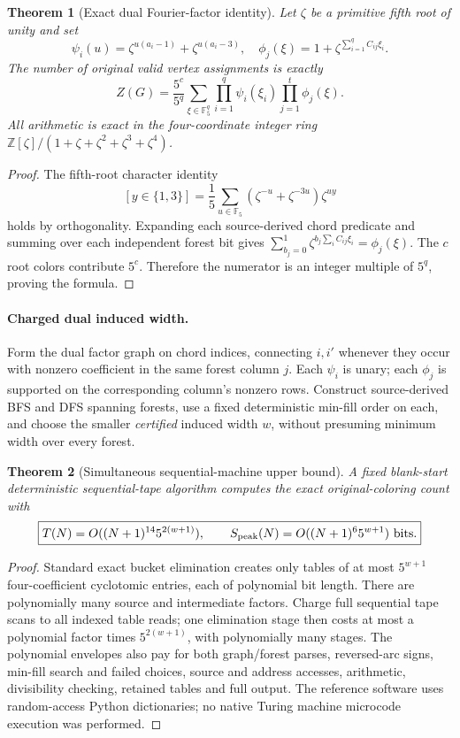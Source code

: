 \documentclass[11pt]{article}
\newtheorem{theorem}{Theorem}
\begin{document}
\begin{theorem}[Exact dual Fourier-factor identity]
Let $\zeta$ be a primitive fifth root of unity and set
\[
 \psi_i(u)=\zeta^{u(a_i-1)}+\zeta^{u(a_i-3)},\quad
 \phi_j(\xi)=1+\zeta^{\sum_{i=1}^q C_{ij}\xi_i}.
\]
The number of original valid vertex assignments is exactly
\[
 \boxed{Z(G)=\frac{5^c}{5^q}
 \sum_{\xi\in\mathbb F_5^q}\prod_{i=1}^q\psi_i(\xi_i)
 \prod_{j=1}^t\phi_j(\xi).}
\]
All arithmetic is exact in the four-coordinate integer ring
$\mathbb Z[\zeta]/(1+\zeta+\zeta^2+\zeta^3+\zeta^4)$.
\end{theorem}
\begin{proof}
The fifth-root character identity
\[
 [y\in\{1,3\}]=\frac15\sum_{u\in\mathbb F_5}
  (\zeta^{-u}+\zeta^{-3u})\zeta^{uy}
\]
holds by orthogonality. Expanding each source-derived chord
predicate and summing over each independent forest bit gives
$\sum_{b_j=0}^1\zeta^{b_j\sum_i C_{ij}\xi_i}=\phi_j(\xi)$.
The $c$ root colors contribute $5^c$. Therefore the numerator
is an integer multiple of $5^q$, proving the formula.
\end{proof}

\paragraph{Charged dual induced width.}
Form the dual factor graph on chord indices, connecting $i,i'$
whenever they occur with nonzero coefficient in the same forest
column $j$. Each $\psi_i$ is unary; each $\phi_j$ is supported
on the corresponding column's nonzero rows. Construct source-derived
BFS and DFS spanning forests, use a fixed deterministic min-fill
order on each, and choose the smaller \emph{certified} induced
width $w$, without presuming minimum width over every forest.

\begin{theorem}[Simultaneous sequential-machine upper bound]
A fixed blank-start deterministic sequential-tape algorithm
computes the exact original-coloring count with
\[
 \boxed{T(N)=O((N+1)^{14}5^{2(w+1)}),\qquad
 S_{\rm peak}(N)=O((N+1)^6 5^{w+1})\ {\rm bits}.}
\]
\end{theorem}
\begin{proof}
Standard exact bucket elimination creates only tables of at
most $5^{w+1}$ four-coefficient cyclotomic entries, each of
polynomial bit length. There are polynomially many source and
intermediate factors. Charge full sequential tape scans to all
indexed table reads; one elimination stage then costs at most
a polynomial factor times $5^{2(w+1)}$, with polynomially many
stages. The polynomial envelopes also pay for both graph/forest
parses, reversed-arc signs, min-fill search and failed choices,
source and address accesses, arithmetic, divisibility checking,
retained tables and full output. The reference software uses
random-access Python dictionaries; no native Turing machine
microcode execution was performed.
\end{proof}
\end{document}
